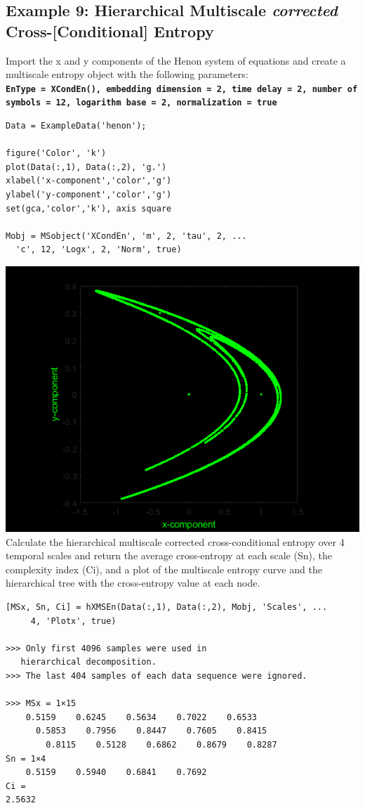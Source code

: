\documentclass[12pt, a4paper, titlepage, openany]{book}
\begin{document}
\subsection{\normalsize Example 9: \hspace{15mm} Hierarchical Multiscale \emph{corrected} Cross-[Conditional] Entropy}
\noindent Import the x and y components of the Henon system of equations and create a multiscale entropy object with the following parameters:\\
\texttt{\textbf{EnType =  XCondEn(), embedding dimension = 2, time delay = 2, number of symbols = 12, logarithm base = 2, normalization = true}}
\begin{verbatim}
Data = ExampleData('henon');

figure('Color', 'k')
plot(Data(:,1), Data(:,2), 'g.')
xlabel('x-component','color','g')
ylabel('y-component','color','g')
set(gca,'color','k'), axis square

Mobj = MSobject('XCondEn', 'm', 2, 'tau', 2, ...
  'c', 12, 'Logx', 2, 'Norm', true)
\end{verbatim}
\includegraphics[scale=.65]{henon.png}\newline \newline
Calculate the hierarchical multiscale corrected cross-conditional entropy over 4 temporal scales and return the average cross-entropy at each scale (Sn), the complexity index (Ci), and a plot of the multiscale entropy curve and the hierarchical tree with the cross-entropy value at each node.
\begin{verbatim}
[MSx, Sn, Ci] = hXMSEn(Data(:,1), Data(:,2), Mobj, 'Scales', ...
	 4, 'Plotx', true)
   
>>> Only first 4096 samples were used in 
   hierarchical decomposition.
>>> The last 404 samples of each data sequence were ignored. 

>>> MSx = 1×15
    0.5159    0.6245    0.5634    0.7022    0.6533  
      0.5853    0.7956    0.8447    0.7605    0.8415  
        0.8115    0.5128    0.6862    0.8679    0.8287
Sn = 1×4
    0.5159    0.5940    0.6841    0.7692
Ci = 
2.5632
\end{verbatim}
\end{document}
